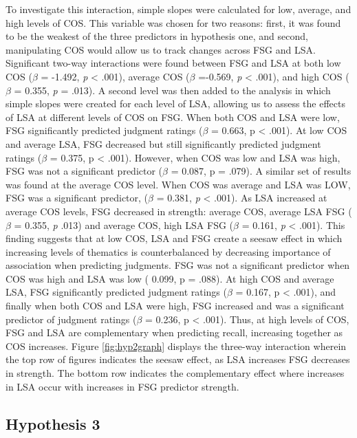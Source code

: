 \documentclass[english,man]{apa6}
\theoremstyle{definition}
\theoremstyle{definition}
\theoremstyle{definition}
\theoremstyle{remark}
\begin{document}
To investigate this interaction, simple slopes were calculated for low,
average, and high levels of COS. This variable was chosen for two
reasons: first, it was found to be the weakest of the three predictors
in hypothesis one, and second, manipulating COS would allow us to track
changes across FSG and LSA. Significant two-way interactions were found
between FSG and LSA at both low COS (\(\beta\) = -1.492, \emph{p}
\textless{} .001), average COS (\(\beta\) =-0.569, \emph{p} \textless{}
.001), and high COS (\(\beta\) = 0.355, \emph{p} = .013). A second level
was then added to the analysis in which simple slopes were created for
each level of LSA, allowing us to assess the effects of LSA at different
levels of COS on FSG. When both COS and LSA were low, FSG significantly
predicted judgment ratings (\(\beta\) = 0.663, p \textless{} .001). At
low COS and average LSA, FSG decreased but still significantly predicted
judgment ratings (\(\beta\) = 0.375, p \textless{} .001). However, when
COS was low and LSA was high, FSG was not a significant predictor
(\(\beta\) = 0.087, p = .079). A similar set of results was found at the
average COS level. When COS was average and LSA was LOW, FSG was a
significant predictor, (\(\beta\) = 0.381, \emph{p} \textless{} .001).
As LSA increased at average COS levels, FSG decreased in strength:
average COS, average LSA FSG (\(\beta\) = 0.355, \emph{p} .013) and
average COS, high LSA FSG (\(\beta\) = 0.161, \emph{p} \textless{}
.001). This finding suggests that at low COS, LSA and FSG create a
seesaw effect in which increasing levels of thematics is counterbalanced
by decreasing importance of association when predicting judgments. FSG
was not a significant predictor when COS was high and LSA was low (
0.099, p = .088). At high COS and average LSA, FSG significantly
predicted judgment ratings (\(\beta\) = 0.167, p \textless{} .001), and
finally when both COS and LSA were high, FSG increased and was a
significant predictor of judgment ratings (\(\beta\) = 0.236, p
\textless{} .001). Thus, at high levels of COS, FSG and LSA are
complementary when predicting recall, increasing together as COS
increases. Figure \ref{fig:hyp2graph} displays the three-way interaction
wherein the top row of figures indicates the seesaw effect, as LSA
increases FSG decreases in strength. The bottom row indicates the
complementary effect where increases in LSA occur with increases in FSG
predictor strength.

\subsection{Hypothesis 3}\label{hypothesis-3}
\end{document}
